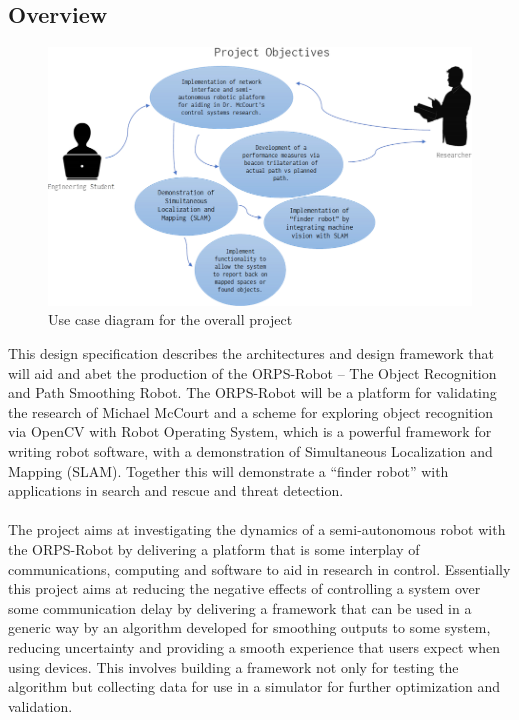 \documentclass[english,12pt]{article}
\begin{document}
\subsection{Overview}
\FloatBarrier
\begin{figure}[H]
    \centerline{\includegraphics[width = \textwidth]{proj_obj.jpg}}
    \caption{Use case diagram for the overall project}
\end{figure}
\FloatBarrier
This design specification describes the architectures and design framework that will aid and abet the
production of the ORPS-Robot – The Object Recognition and Path Smoothing Robot. The
ORPS-Robot will be a platform for validating the research of Michael McCourt and a scheme for
exploring object recognition via OpenCV with Robot Operating System, which is a powerful framework
for writing robot software, with a demonstration of Simultaneous Localization and Mapping
(SLAM). Together this will demonstrate a “finder robot” with applications in search and rescue and
threat detection.\\\\
The project aims
at investigating the dynamics of a semi-autonomous robot with the 
ORPS-Robot by delivering a platform that is some interplay of communications, computing and
software to aid in research in control.
Essentially this project aims at reducing the negative effects of controlling a system over 
some communication delay by delivering a framework that can be used in a generic way by 
an algorithm developed for smoothing outputs to some system, reducing uncertainty and 
providing a smooth experience that users expect when using devices. This involves building 
a framework not only for testing the algorithm but collecting data for use in a simulator 
for further optimization and validation.
\end{document}
